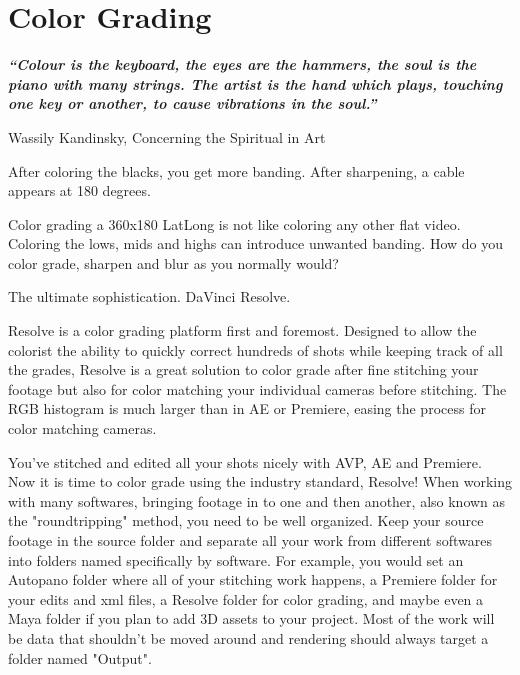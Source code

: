 \chapter{Color Grading}
\pagecolor{white}
\label{chap:54}
\begin{fullwidth}

{\itshape\bfseries “Colour is the keyboard, the eyes are the hammers, the soul is the piano with many strings. The artist is the hand which plays, touching one key or another, to cause vibrations in the soul.”}

Wassily Kandinsky, Concerning the Spiritual in Art
\vspace{\baselineskip}

\problem

{\large After coloring the blacks, you get more banding. After sharpening, a cable appears at 180 degrees. \par}

Color grading a 360x180 LatLong is not like coloring any other flat video. Coloring the lows, mids and highs can introduce unwanted banding. How do you color grade, sharpen and blur as you normally would? 

\solution

{\large The ultimate sophistication. DaVinci Resolve. \par}

Resolve is a color grading platform first and foremost. Designed to allow the colorist the ability to quickly correct hundreds of shots while keeping track of all the grades, Resolve is a great solution to color grade after fine stitching your footage but also for color matching your individual cameras before stitching. The RGB histogram is much larger than in AE or Premiere, easing the process for color matching cameras.


You've stitched and edited all your shots nicely with AVP, AE and Premiere. Now it is time to color grade using the industry standard, Resolve! When working with many softwares, bringing footage in to one and then another, also known as the "roundtripping" method, you need to be well organized. Keep your source footage in the source folder and separate all your work from different softwares into folders named specifically by software. For example, you would set an Autopano folder where all of your stitching work happens, a Premiere folder for your edits and xml files, a Resolve folder for color grading, and maybe even a Maya folder if you plan to add 3D assets to your project. Most of the work will be data that shouldn't be moved around and rendering should always target a folder named "Output". 


\end{fullwidth}
